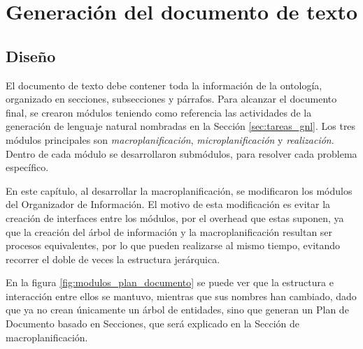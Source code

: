 \chapter{Generación del documento de texto}

\section{Diseño}
El documento de texto debe contener toda la información de la ontología, organizado en secciones, subsecciones y párrafos. Para alcanzar el documento final, se crearon módulos teniendo como referencia las actividades de la generación de lenguaje natural nombradas en la Sección \ref{sec:tareas_gnl}. Los tres módulos principales son \emph{macroplanificación}, \emph{microplanificación} y \emph{realización}. Dentro de cada módulo se desarrollaron submódulos, para resolver cada problema específico. 

En este capítulo, al desarrollar la macroplanificación, se modificaron los módulos del Organizador de Información. El motivo de esta modificación es evitar la creación de interfaces entre los módulos, por el overhead que estas suponen, ya que la creación del árbol de información y la macroplanificación resultan ser procesos equivalentes, por lo que pueden realizarse al mismo tiempo, evitando recorrer el doble de veces la estructura jerárquica. 

En la figura \ref{fig:modulos_plan_documento} se puede ver que la estructura e interacción entre ellos se mantuvo, mientras que sus nombres han cambiado, dado que ya no crean únicamente un árbol de entidades, sino que generan un Plan de Documento basado en Secciones, que será explicado en la Sección de macroplanificación. 

